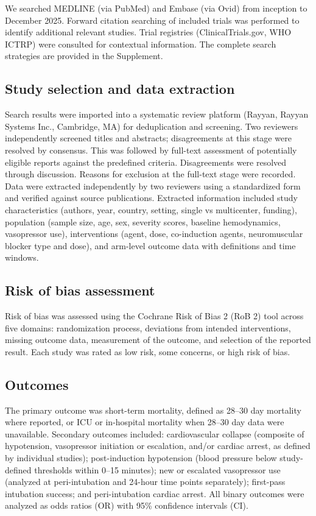 \documentclass[11pt]{article}
\begin{document}
We searched MEDLINE (via PubMed) and Embase (via Ovid) from inception to December 2025. Forward citation searching of included trials was performed to identify additional relevant studies. Trial registries (ClinicalTrials.gov, WHO ICTRP) were consulted for contextual information. The complete search strategies are provided in the Supplement.

\subsection{Study selection and data extraction}

Search results were imported into a systematic review platform (Rayyan, Rayyan Systems Inc., Cambridge, MA) for deduplication and screening. Two reviewers independently screened titles and abstracts; disagreements at this stage were resolved by consensus. This was followed by full-text assessment of potentially eligible reports against the predefined criteria. Disagreements were resolved through discussion. Reasons for exclusion at the full-text stage were recorded. Data were extracted independently by two reviewers using a standardized form and verified against source publications. Extracted information included study characteristics (authors, year, country, setting, single vs multicenter, funding), population (sample size, age, sex, severity scores, baseline hemodynamics, vasopressor use), interventions (agent, dose, co-induction agents, neuromuscular blocker type and dose), and arm-level outcome data with definitions and time windows.

\subsection{Risk of bias assessment}

Risk of bias was assessed using the Cochrane Risk of Bias 2 (RoB 2) tool\cite{sterne2019} across five domains: randomization process, deviations from intended interventions, missing outcome data, measurement of the outcome, and selection of the reported result. Each study was rated as low risk, some concerns, or high risk of bias.

\subsection{Outcomes}

The primary outcome was short-term mortality, defined as 28--30 day mortality where reported, or ICU or in-hospital mortality when 28--30 day data were unavailable. Secondary outcomes included: cardiovascular collapse (composite of hypotension, vasopressor initiation or escalation, and/or cardiac arrest, as defined by individual studies); post-induction hypotension (blood pressure below study-defined thresholds within 0--15 minutes); new or escalated vasopressor use (analyzed at peri-intubation and 24-hour time points separately); first-pass intubation success; and peri-intubation cardiac arrest. All binary outcomes were analyzed as odds ratios (OR) with 95\% confidence intervals (CI).
\end{document}
